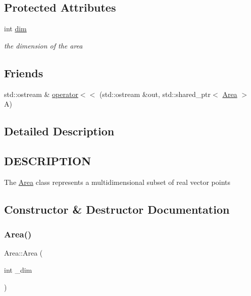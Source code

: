 \subsection*{Protected Attributes}
\begin{DoxyCompactItemize}
\item 
\mbox{\label{class_area_ad1b73c86b972c92515c26f9f6a78afab}} 
int \hyperlink{class_area_ad1b73c86b972c92515c26f9f6a78afab}{dim}
\begin{DoxyCompactList}\small\item\em the dimension of the area \end{DoxyCompactList}\end{DoxyCompactItemize}
\subsection*{Friends}
\begin{DoxyCompactItemize}
\item 
std\+::ostream \& \hyperlink{class_area_ada6f29b8de500da1ce8e36efb839d484}{operator$<$$<$} (std\+::ostream \&out, std\+::shared\+\_\+ptr$<$ \hyperlink{class_area}{Area} $>$ A)
\end{DoxyCompactItemize}


\subsection{Detailed Description}
\hypertarget{function_8h_DESCRIPTION}{}\subsection{D\+E\+S\+C\+R\+I\+P\+T\+I\+ON}\label{function_8h_DESCRIPTION}
The \hyperlink{class_area}{Area} class represents a multidimensional subset of real vector points 

\subsection{Constructor \& Destructor Documentation}
\mbox{\label{class_area_acb26df340d249e1704501d55cacbc93e}} 
\subsubsection{\texorpdfstring{Area()}{Area()}}
{\footnotesize\ttfamily Area\+::\+Area (\begin{DoxyParamCaption}\item[{int}]{\+\_\+dim }\end{DoxyParamCaption})\hspace{0.3cm}{\ttfamily [inline]}}

